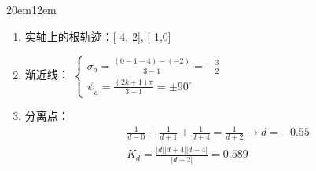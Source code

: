\documentclass[handout,cjkutf8,table,aspectratio=1610]{beamer} %
\begin{document}
\begin{frame}{}
\begin{overlayarea}{20em}{12em}
{\begin{enumerate}[(1)]
		\item 实轴上的根轨迹：[-4,-2], [-1,0]
		\item 渐近线：
			$\left\{\begin{matrix}
				\sigma_a = \frac{(0-1-4)-(-2)}{3-1}=-\frac{3}{2}\\
				\psi_a = \frac{(2k+1)\pi}{3-1} = \pm 90^\circ
			\end{matrix}\right.$
		\item 分离点：
			\begin{align*}
				&\frac{1}{d-0}+\frac{1}{d+1}+\frac{1}{d+4} = \frac{1}{d+2} \rightarrow d = -0.55\\
				&K_d = \frac{|d||d+4||d+4|}{|d+2|} = 0.589
			\end{align*}
	\end{enumerate}
	}
	\end{overlayarea}
\end{frame}
\end{document}
